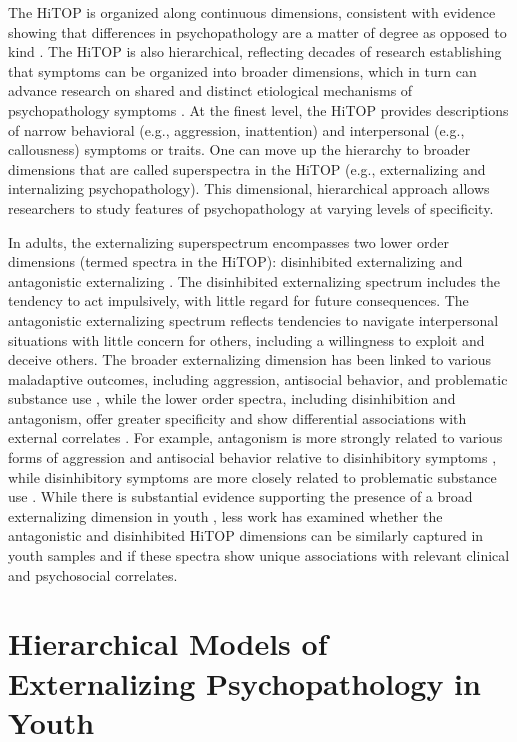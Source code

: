 \documentclass[
  20pt,
  number,
  preprint,
  3p,
  twocolumn]{elsarticle}
\begin{document}
The HiTOP is organized along continuous dimensions, consistent with
evidence showing that differences in psychopathology are a matter of
degree as opposed to kind \citep{haslam2012}. The HiTOP is also
hierarchical, reflecting decades of research establishing that symptoms
can be organized into broader dimensions, which in turn can advance
research on shared and distinct etiological mechanisms of
psychopathology symptoms \citep{lahey2017}. At the finest level, the
HiTOP provides descriptions of narrow behavioral (e.g., aggression,
inattention) and interpersonal (e.g., callousness) symptoms or traits.
One can move up the hierarchy to broader dimensions that are called
superspectra in the HiTOP (e.g., externalizing and internalizing
psychopathology). This dimensional, hierarchical approach allows
researchers to study features of psychopathology at varying levels of
specificity.

In adults, the externalizing superspectrum encompasses two lower order
dimensions (termed spectra in the HiTOP): disinhibited externalizing and
antagonistic externalizing \citep{krueger2021}. The disinhibited
externalizing spectrum includes the tendency to act impulsively, with
little regard for future consequences. The antagonistic externalizing
spectrum reflects tendencies to navigate interpersonal situations with
little concern for others, including a willingness to exploit and
deceive others. The broader externalizing dimension has been linked to
various maladaptive outcomes, including aggression, antisocial behavior,
and problematic substance use \citep[e.g.,][]{krueger2007}, while the
lower order spectra, including disinhibition and antagonism, offer
greater specificity and show differential associations with external
correlates \citep{mullins-sweatt2022}. For example, antagonism is more
strongly related to various forms of aggression and antisocial behavior
relative to disinhibitory symptoms \citep{vize2018}, while disinhibitory
symptoms are more closely related to problematic substance use
\citep[e.g.,][]{venables2012}. While there is substantial evidence
supporting the presence of a broad externalizing dimension in youth
\citep[e.g.,][]{bongers2004}, less work has examined whether the
antagonistic and disinhibited HiTOP dimensions can be similarly captured
in youth samples and if these spectra show unique associations with
relevant clinical and psychosocial correlates.

\hypertarget{hierarchical-models-of-externalizing-psychopathology-in-youth}{%
\section{Hierarchical Models of Externalizing Psychopathology in
Youth}\label{hierarchical-models-of-externalizing-psychopathology-in-youth}}
\end{document}
